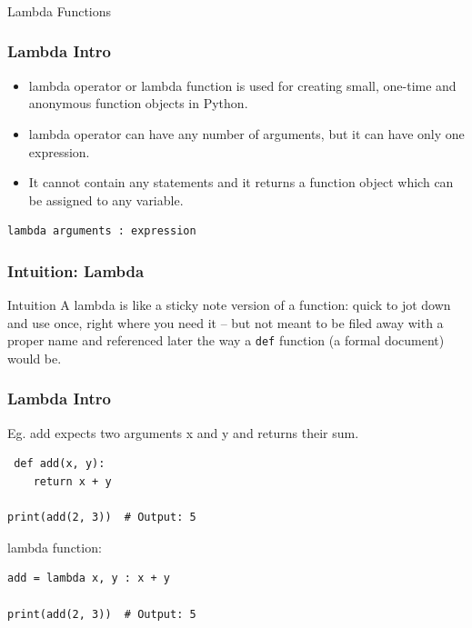\begin{frame}[fragile]\frametitle{}
\begin{center}
{\Large Lambda Functions}
\end{center}
\end{frame}

\begin{frame}[fragile]\frametitle{Lambda Intro}

    \begin{itemize}
    \item  lambda operator or lambda function is used for creating small, one-time and anonymous function objects in Python.
    \item lambda operator can have any number of arguments, but it can have only one expression. 
    \item It cannot contain any statements and it returns a function object which can be assigned to any variable.
    \end{itemize}
    \begin{lstlisting}
lambda arguments : expression
\end{lstlisting}
\end{frame}

\begin{frame}[fragile]\frametitle{Intuition: Lambda}
\begin{block}{Intuition}
A lambda is like a sticky note version of a function: quick to jot down and use once, right
where you need it -- but not meant to be filed away with a proper name and referenced later the
way a \texttt{def} function (a formal document) would be.
\end{block}
\end{frame}

\begin{frame}[fragile]\frametitle{Lambda Intro}
Eg. add expects two arguments x and y and returns their sum.
\begin{lstlisting}
 def add(x, y):
    return x + y

print(add(2, 3))  # Output: 5
\end{lstlisting}
lambda function:
\begin{lstlisting}
add = lambda x, y : x + y

print(add(2, 3))  # Output: 5
\end{lstlisting}
\end{frame}


